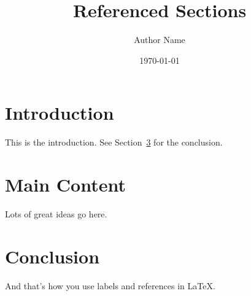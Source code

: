 \documentclass{article}
\title{Referenced Sections}
\author{Author Name}
\date{\today}
\begin{document}
\maketitle

\section{Introduction}
This is the introduction. See Section~\ref{sec:conclusion} for the conclusion.

\section{Main Content}
Lots of great ideas go here.

\section{Conclusion}
\label{sec:conclusion}
And that's how you use labels and references in LaTeX.
\end{document}
